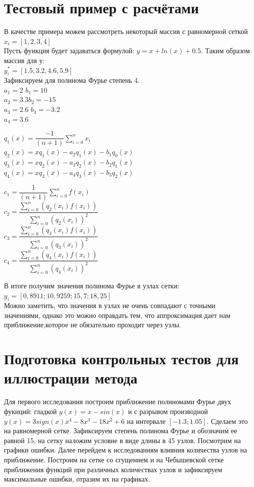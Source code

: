 \documentclass[a4paper]{article}
\begin{document}
\section{Тестовый пример с расчётами} 
В качестве примера  можем рассмотреть некоторый массив с равномерной сеткой   $x_i = [1, 2, 3, 4]$\\
Пусть функция будет задаваться формулой:  $y = x+ln(x)+0.5$. Таким образом массив для у:\\
$ y_i^* = [1.5, 3.2, 4.6, 5.9]$\\
Зафиксируем для полинома Фурье степень 4.\\
$a_1=2$  \hspace{45pt}$b_1=10$  \\    
$a_2=3.3$\hspace{39pt}$b_2=-15$  	\\
$a_3=2.6$\hspace{36pt} $b_3=-3.2$ \\
$a_4=3.6$\\

\begin{center}
$q_1(x)= \dfrac{- 1}{(n+1)}\sum_{i=0}^n x_i$\\
$q_2(x) = xq_1(x)-a_2q_1(x)-b_1q_0(x)$\\
$q_3(x) =xq_2(x)-a_3q_2(x)-b_2q_1(x)$\\
$q_4(x) = xq_3(x)-a_4q_3(x)-b_3q_2(x)$\\
\end{center}
\begin{center}
$c_1 = \dfrac{1}{(n+1)}\sum_{i=0}^n f(x_i)$\\
$c_2 = \dfrac{\sum_{i=0}^n(q_2(x_i)f(x_i))}{\sum_{i=0}^n(q_2(x_i))^2}$\\
$c_3 = \dfrac{\sum_{i=0}^n(q_3(x_i)f(x_i))}{\sum_{i=0}^n(q_3(x_i))^2}$\\
$c_4 =\dfrac{\sum_{i=0}^n(q_4(x_i)f(x_i))}{\sum_{i=0}^n(q_4(x_i))^2}$\\
\end{center}

В итоге получим значения полинома Фурье в узлах сетки:\\
$y_i=[0,8911;10,9259;15,7;18,25]$\\
Можно заметить, что значения в узлах не очень совпадают с точными значениями, однако это можно оправдать тем, что аппроксимация дает нам приближение,которое не обязательно проходит через узлы.

 
\section{Подготовка контрольных тестов для иллюстрации метода} 
Для первого исследования построим приближение полиномами Фурье двух фукнций: гладкой $ y(x) = x - sin(x)$ и с разрывом производной $ y(x) = 3sign(x)x^{4}-8x^{3}-18x^{2}+6$ на интервале $[-1.3;1.05]$. Сделаем это на равномерной сетке. Зафиксируем степень полинома Фурье и обозначим ее равной 15, на сетку наложим условие в виде длины в 45 узлов. Посмотрим на графики ошибки.
Далее перейдем к исследованиям влияния количества узлов на приближение. Построим на сетке со сгущением и на Чебышевской сетке приближения функций при различных количествах узлов и зафиксируем максимальные ошибки, отразим их на графиках.
  
\end{document}

